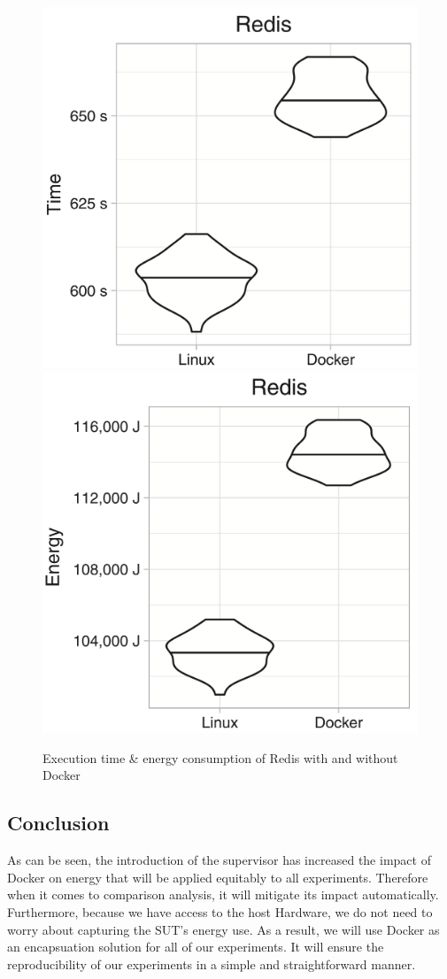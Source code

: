 \begin{figure}[!bht]
    \includegraphics[width=.5\linewidth]{imgs/docker_vs_vm_energy_paper/reddis_time}
    \includegraphics[width=.5\linewidth]{imgs/docker_vs_vm_energy_paper/reddis_energy}
    \caption{Execution time \& energy consumption of Redis with and without Docker~\cite{santos2018does}}\label{fig:docker_reddis}
\end{figure}


\subsection{Conclusion}
As can be seen, the introduction of the supervisor has increased the impact of Docker on energy that will be applied equitably to all experiments.
Therefore when it comes to comparison analysis, it will mitigate its impact automatically.
Furthermore, because we have access to the host Hardware, we do not need to worry about capturing the SUT's energy use.
As a result, we will use Docker as an encapsuation solution for all of our experiments.
It will ensure the reproducibility of our experiments in a simple and straightforward manner.
\clearpage
